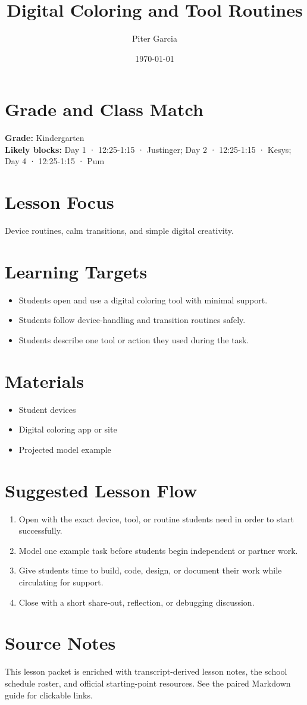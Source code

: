 \documentclass[11pt]{article}
\title{Digital Coloring and Tool Routines}
\author{Piter Garcia}
\date{\today}
\begin{document}
\maketitle

\section*{Grade and Class Match}
\textbf{Grade:} Kindergarten\\
\textbf{Likely blocks:} Day 1 · 12:25-1:15 · Justinger; Day 2 · 12:25-1:15 · Kesys; Day 4 · 12:25-1:15 · Pum

\section*{Lesson Focus}
Device routines, calm transitions, and simple digital creativity.

\section*{Learning Targets}
\begin{itemize}[leftmargin=*]
\item Students open and use a digital coloring tool with minimal support.
\item Students follow device-handling and transition routines safely.
\item Students describe one tool or action they used during the task.
\end{itemize}

\section*{Materials}
\begin{itemize}[leftmargin=*]
\item Student devices
\item Digital coloring app or site
\item Projected model example
\end{itemize}

\section*{Suggested Lesson Flow}
\begin{enumerate}[leftmargin=*]
\item Open with the exact device, tool, or routine students need in order to start successfully.
\item Model one example task before students begin independent or partner work.
\item Give students time to build, code, design, or document their work while circulating for support.
\item Close with a short share-out, reflection, or debugging discussion.
\end{enumerate}

\section*{Source Notes}
This lesson packet is enriched with transcript-derived lesson notes, the school schedule roster, and official starting-point resources. See the paired Markdown guide for clickable links.



\end{document}
